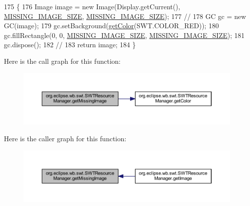 \begin{DoxyCode}
175                                            \{
176         Image image = \textcolor{keyword}{new} Image(Display.getCurrent(), \hyperlink{classorg_1_1eclipse_1_1wb_1_1swt_1_1_s_w_t_resource_manager_af1e192f035fe5d70232cd33ca3810a4f}{MISSING\_IMAGE\_SIZE}, 
      \hyperlink{classorg_1_1eclipse_1_1wb_1_1swt_1_1_s_w_t_resource_manager_af1e192f035fe5d70232cd33ca3810a4f}{MISSING\_IMAGE\_SIZE});
177         \textcolor{comment}{//}
178         GC gc = \textcolor{keyword}{new} GC(image);
179         gc.setBackground(\hyperlink{classorg_1_1eclipse_1_1wb_1_1swt_1_1_s_w_t_resource_manager_a261745b44e6e7846bd9b98c6777600eb}{getColor}(SWT.COLOR\_RED));
180         gc.fillRectangle(0, 0, \hyperlink{classorg_1_1eclipse_1_1wb_1_1swt_1_1_s_w_t_resource_manager_af1e192f035fe5d70232cd33ca3810a4f}{MISSING\_IMAGE\_SIZE}, 
      \hyperlink{classorg_1_1eclipse_1_1wb_1_1swt_1_1_s_w_t_resource_manager_af1e192f035fe5d70232cd33ca3810a4f}{MISSING\_IMAGE\_SIZE});
181         gc.dispose();
182         \textcolor{comment}{//}
183         \textcolor{keywordflow}{return} image;
184     \}
\end{DoxyCode}


Here is the call graph for this function\-:\nopagebreak
\begin{figure}[H]
\begin{center}
\leavevmode
\includegraphics[width=350pt]{classorg_1_1eclipse_1_1wb_1_1swt_1_1_s_w_t_resource_manager_a1ff45fd318d3ffda2bb99acbcf2153bc_cgraph}
\end{center}
\end{figure}




Here is the caller graph for this function\-:\nopagebreak
\begin{figure}[H]
\begin{center}
\leavevmode
\includegraphics[width=350pt]{classorg_1_1eclipse_1_1wb_1_1swt_1_1_s_w_t_resource_manager_a1ff45fd318d3ffda2bb99acbcf2153bc_icgraph}
\end{center}
\end{figure}




